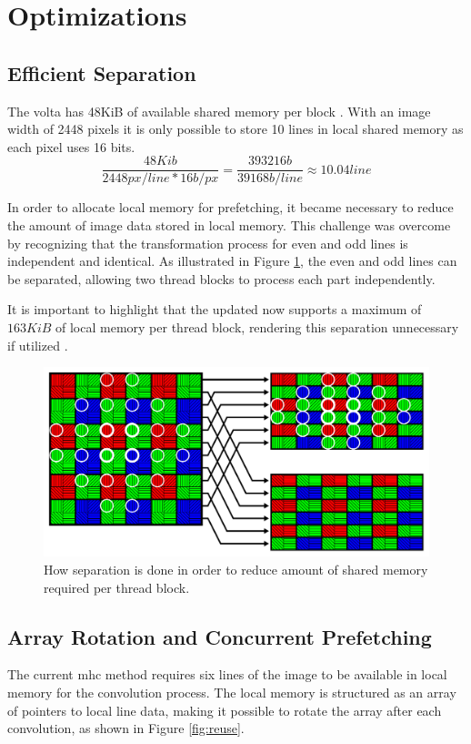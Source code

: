 \section{Optimizations}
\subsection{Efficient Separation}
The \gls{volta} has 48KiB of available shared memory per block \cite{rigerunNVIDIAJetsonXavier2023}.
With an image width of 2448 pixels \cite{lucidvisionlabsTriton0MPPolarization} it is only possible to store 10 lines in local shared memory as each pixel uses 16 bits.
\begin{equation*}
    \frac{48Kib}{2448px/line * 16b/px} = \frac{393216b}{39168b/line} \approx 10.04line
\end{equation*}

In order to allocate local memory for prefetching, it became necessary to reduce the amount of image data stored in local memory.
This challenge was overcome by recognizing that the transformation process for even and odd lines is independent and identical.
As illustrated in Figure \ref{fig:saperation}, the even and odd lines can be separated, allowing two thread blocks to process each part independently.

It is important to highlight that the updated \jo now supports a maximum of $163KiB$ of local memory per thread block, rendering this separation unnecessary if utilized \cite{CUDA2023}.
\begin{figure}[H]
    \centering
    \includegraphics[width=.8\textwidth]{figures/polarized_image/separation.pdf}
    \caption{How separation is done in order to reduce amount of shared memory required per thread block.}
    \label{fig:saperation}
\end{figure}

\subsection{Array Rotation and Concurrent Prefetching}
The current \gls{mhc} method requires six lines of the image to be available in local memory for the convolution process.
The local memory is structured as an array of pointers to local line data, making it possible to rotate the array after each convolution, as shown in Figure \ref{fig:reuse}.

